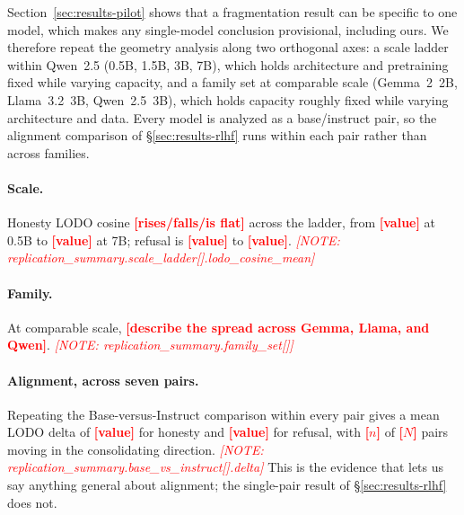 \documentclass[11pt]{article}
\newcommand{\PH}[1]{\textcolor{red}{\textbf{[#1]}}}
\newcommand{\phnote}[1]{\textcolor{red}{\footnotesize\textit{[NOTE: #1]}}}
\begin{document}
Section~\ref{sec:results-pilot} shows that a fragmentation result can be
specific to one model, which makes any single-model conclusion provisional,
including ours. We therefore repeat the geometry analysis along two
orthogonal axes: a scale ladder within Qwen~2.5 (0.5B, 1.5B, 3B, 7B), which
holds architecture and pretraining fixed while varying capacity, and a family
set at comparable scale (Gemma~2~2B, Llama~3.2~3B, Qwen~2.5~3B), which holds
capacity roughly fixed while varying architecture and data. Every model is
analyzed as a base/instruct pair, so the alignment comparison of
\S\ref{sec:results-rlhf} runs within each pair rather than across families.

\paragraph{Scale.}
Honesty LODO cosine \PH{rises/falls/is flat} across the ladder, from
\PH{value} at 0.5B to \PH{value} at 7B; refusal is \PH{value} to \PH{value}.
\phnote{replication\_summary.scale\_ladder[].lodo\_cosine\_mean}

\paragraph{Family.}
At comparable scale, \PH{describe the spread across Gemma, Llama, and Qwen}.
\phnote{replication\_summary.family\_set[]}

\paragraph{Alignment, across seven pairs.}
Repeating the Base-versus-Instruct comparison within every pair gives a mean
LODO delta of \PH{value} for honesty and \PH{value} for refusal, with
\PH{$n$} of \PH{$N$} pairs moving in the consolidating direction.
\phnote{replication\_summary.base\_vs\_instruct[].delta}
This is the evidence that lets us say anything general about alignment; the
single-pair result of \S\ref{sec:results-rlhf} does not.
\end{document}
